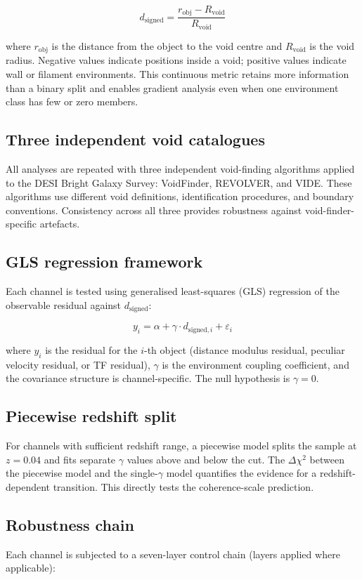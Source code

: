 \documentclass[11pt,a4paper]{article}
\begin{document}
\[
d_\mathrm{signed} = \frac{r_\mathrm{obj} - R_\mathrm{void}}{R_\mathrm{void}}
\]

where \(r_\mathrm{obj}\) is the distance from the object to the void centre and \(R_\mathrm{void}\) is the void radius. Negative values indicate positions inside a void; positive values indicate wall or filament environments. This continuous metric retains more information than a binary split and enables gradient analysis even when one environment class has few or zero members.

\subsection{Three independent void catalogues}
All analyses are repeated with three independent void-finding algorithms applied to the DESI Bright Galaxy Survey: VoidFinder, REVOLVER, and VIDE. These algorithms use different void definitions, identification procedures, and boundary conventions. Consistency across all three provides robustness against void-finder-specific artefacts.

\subsection{GLS regression framework}
Each channel is tested using generalised least-squares (GLS) regression of the observable residual against \(d_\mathrm{signed}\):

\[
y_i = \alpha + \gamma \cdot d_{\mathrm{signed},i} + \varepsilon_i
\]

where \(y_i\) is the residual for the \(i\)-th object (distance modulus residual, peculiar velocity residual, or TF residual), \(\gamma\) is the environment coupling coefficient, and the covariance structure is channel-specific. The null hypothesis is \(\gamma = 0\).

\subsection{Piecewise redshift split}
For channels with sufficient redshift range, a piecewise model splits the sample at \(z = 0.04\) and fits separate \(\gamma\) values above and below the cut. The \(\Delta\chi^2\) between the piecewise model and the single-\(\gamma\) model quantifies the evidence for a redshift-dependent transition. This directly tests the coherence-scale prediction.

\subsection{Robustness chain}
Each channel is subjected to a seven-layer control chain (layers applied where applicable):
\end{document}
